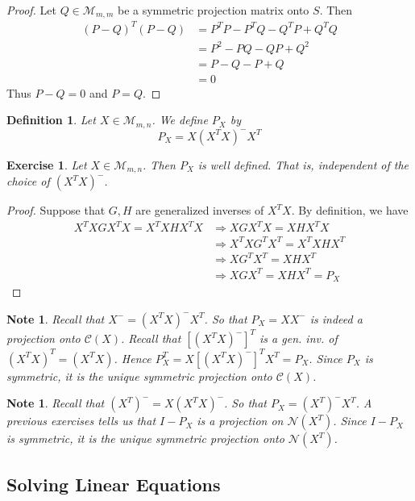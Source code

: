 \documentclass[12pt]{amsart}
\newtheorem{defn}[thm]{Definition}
\newtheorem{note}[thm]{Note}
\newtheorem{ex}[thm]{Exercise}
\newcommand{\MC}{\mathcal{C}}
\newcommand{\MN}{\mathcal{N}}
\newcommand{\MM}{\mathcal{M}}
\newcommand{\z}[1]{Let ${#1} \in \MM_{m,n}$}
\begin{document}
\begin{proof}
Let $Q \in \MM_{m,m}$ be a symmetric projection matrix onto $S$. Then 
\begin{align*}
(P-Q)^T(P-Q) 
&= P^TP - P^TQ - Q^TP + Q^TQ \\
&= P^2 - PQ - QP +Q^2 \\
&= P - Q - P + Q \\
&= 0
\end{align*}
Thus $P-Q = 0$ and $P =Q$.
\end{proof}

\begin{defn}
\z{X}. We define $P_X$ by $$P_X = X (X^TX)^-X^T$$
\end{defn}

\begin{ex}
\z{X}. Then $P_X$ is well defined. That is, independent of the choice of $(X^TX)^-$.
\end{ex}

\begin{proof}
Suppose that $G, H$ are generalized inverses of $X^TX$. By definition, we have 
\begin{align*}
X^TXGX^TX = X^TXHX^TX 
& \Rightarrow XGX^TX = XHX^TX \\
& \Rightarrow X^TXG^TX^T = X^TXHX^T \\
& \Rightarrow XG^TX^T = XHX^T \\
& \Rightarrow XGX^T = XHX^T = P_X
\end{align*}
\end{proof}

\begin{note}
Recall that $X^- = (X^TX)^-X^T$. So that $P_X = XX^-$ is indeed a projection onto $\MC(X)$. Recall that $[(X^TX)^-]^T$ is a gen. inv. of $(X^TX)^T = (X^TX)$. Hence $P_X^T = X[(X^TX)^-]^TX^T = P_X$. Since $P_X$ is symmetric, it is the unique symmetric projection onto $\MC(X)$. 
\end{note}

\begin{note}
Recall that $(X^T)^- = X(X^TX)^-$. So that $P_X = (X^T)^-X^T$. A previous exercises tells us that $I-P_X$ is a projection on $\MN(X^T)$. Since $I-P_X$ is symmetric, it is the unique symmetric projection onto $\MN(X^T)$. 
\end{note}

\subsection{Solving Linear Equations}
\end{document}
